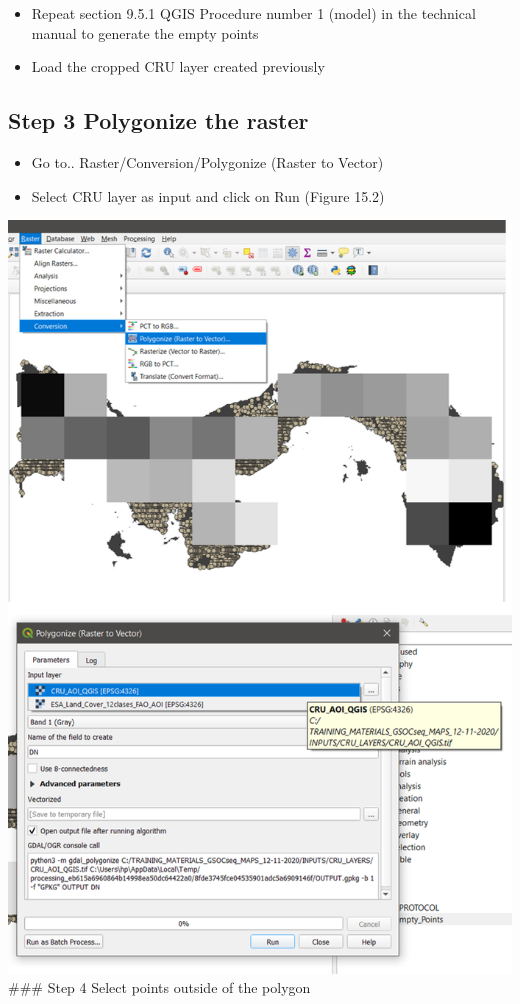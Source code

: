 \documentclass[
  10pt,
  b5paper,
]{book}
\providecommand{\tightlist}{%
  \setlength{\itemsep}{0pt}\setlength{\parskip}{0pt}}
\begin{document}
\begin{itemize}
\tightlist
\item
  Repeat section 9.5.1 QGIS Procedure number 1 (model) in the technical manual to generate the empty points
\item
  Load the cropped CRU layer created previously
\end{itemize}

\hypertarget{step-3-polygonize-the-raster}{%
\subsection{Step 3 Polygonize the raster}\label{step-3-polygonize-the-raster}}

\begin{itemize}
\tightlist
\item
  Go to.. Raster/Conversion/Polygonize (Raster to Vector)
\item
  Select CRU layer as input and click on Run (Figure 15.2)
\end{itemize}

\includegraphics{images/Figure_11.png}
\#\#\# Step 4 Select points outside of the polygon
\end{document}
